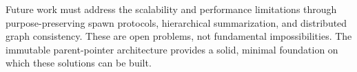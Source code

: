 Future work must address the scalability and performance limitations
through purpose-preserving spawn protocols, hierarchical summarization,
and distributed graph consistency. These are open problems, not
fundamental impossibilities. The immutable parent-pointer architecture
provides a solid, minimal foundation on which these solutions can be
built.




